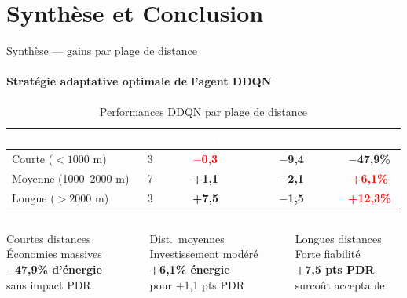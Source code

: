\documentclass[aspectratio=169, 11pt]{beamer}
\newcommand{\cellgreen}[1]{\cellcolor{green!10}\textcolor{green!50!black}{\textbf{#1}}}
\newcommand{\cellred}[1]{\cellcolor{red!10}\textcolor{red}{\textbf{#1}}}
\begin{document}
	\section{Synthèse et Conclusion}
	
	\begin{frame}{Synthèse — gains par plage de distance}
		\framesubtitle{Stratégie adaptative optimale de l'agent DDQN}
		
		\begin{table}
			\centering
			\renewcommand{\arraystretch}{1.4}
			\begin{tabular}{|l|c|c|c|c|}
				\hline
				\rowcolor{blue!50}
				\textcolor{white}{\textbf{Plage}} &
				\textcolor{white}{\textbf{Cas}} &
				\textcolor{white}{\textbf{$\Delta$PDR (pts)}} &
				\textcolor{white}{\textbf{$\Delta$Puiss. (dBm)}} &
				\textcolor{white}{\textbf{$\Delta$Énergie}} \\
				\hline
				Courte ($< 1000$ m)      & 3 & \cellred{$-$0,3}  & \cellgreen{$-$9,4}  & \cellgreen{$-$47,9\%} \\
				\hline
				Moyenne (1000--2000 m)   & 7 & \cellgreen{+1,1}  & \cellgreen{$-$2,1}  & \cellred{+6,1\%} \\
				\hline
				Longue ($> 2000$ m)      & 3 & \cellgreen{+7,5}  & \cellgreen{$-$1,5}  & \cellred{+12,3\%} \\
				\hline
			\end{tabular}
			\caption{Performances DDQN par plage de distance}
			\label{tab:synthese_plages}
		\end{table}
		
		\vspace{0.5em}
		\begin{columns}[T]
			\begin{exampleblock}{\centering\small Courtes distances}
				\centering\footnotesize Économies massives\\
				\textbf{$-$47,9\% d'énergie}\\sans impact PDR
			\end{exampleblock}
			\begin{block}{\centering\small Dist.\ moyennes}
				\centering\footnotesize Investissement modéré\\
				\textbf{+6,1\% énergie}\\pour +1,1 pts PDR
			\end{block}
			\begin{exampleblock}{\centering\small Longues distances}
				\centering\footnotesize Forte fiabilité\\
				\textbf{+7,5 pts PDR}\\surcoût acceptable
			\end{exampleblock}
		\end{columns}
	\end{frame}
	
\end{document}
